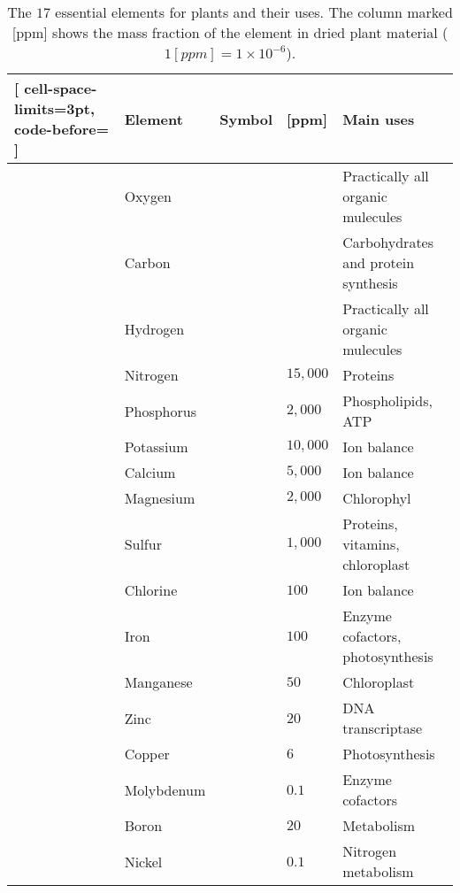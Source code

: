 \begin{table}[htpb]
	\centering
	\caption{The $17$ essential elements for plants and their uses. The column marked [\si{ppm}] shows the mass fraction of the element in dried plant material ($1 [\si{ppm}]=1 \times 10^{-6}$).}
	\label{tab:plant_nutrients}
	\begin{NiceTabular}{p{3mm}lcll}[
			cell-space-limits=3pt, code-before= 
		]
		\toprule
		\RowStyle{\bfseries} & Element & Symbol & [ppm] & Main uses \\
		\midrule
		& Oxygen &  & & Practically all organic mulecules \\
		& Carbon &  & & Carbohydrates and protein synthesis \\
		& Hydrogen &  & & Practically all organic mulecules \\
		\midrule
		& Nitrogen &  & $15,000$ & Proteins \\
		& Phosphorus &  & $2,000$ & Phospholipids, ATP \\
		& Potassium &  & $10,000$ & Ion balance \\
		& Calcium &  & $5,000$ & Ion balance \\
		& Magnesium &  & $2,000$ & Chlorophyl \\
		& Sulfur &  & $1,000$& Proteins, vitamins, chloroplast \\
		\midrule
		& Chlorine &  & $100$ & Ion balance \\
		& Iron &  & $100$ & Enzyme cofactors, photosynthesis \\
		& Manganese &  & $50$ & Chloroplast \\
		& Zinc &  & $20$ & DNA transcriptase \\
		& Copper &  & $6$ & Photosynthesis \\
		& Molybdenum &  & $0.1$ & Enzyme cofactors \\
		& Boron &  & $20$ & Metabolism \\
		& Nickel &  & $0.1$ & Nitrogen metabolism \\
		\bottomrule
	\end{NiceTabular}
\end{table}

